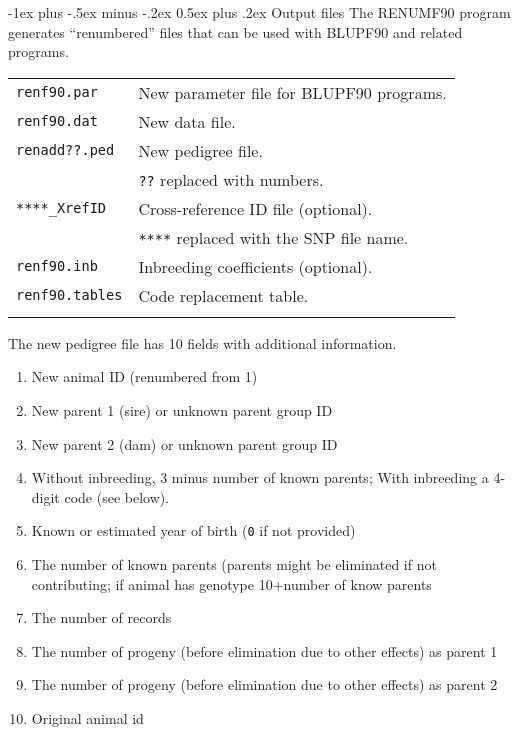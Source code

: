 \documentclass[10pt,landscape]{article}
\makeatletter
\renewcommand{\section}{\@startsection{section}{1}{0mm}%
                                {-1ex plus -.5ex minus -.2ex}%
                                {0.5ex plus .2ex}%
                                {\normalfont\large\bfseries}}
\makeatother
\begin{document}
\begin{multicols}{3}
\section{Output files}
The RENUMF90 program generates ``renumbered'' files that can be used with BLUPF90 and related programs.

\begin{tabular}{@{}ll@{}}
  \verb|renf90.par| & New parameter file for BLUPF90 programs.\\
  \verb|renf90.dat| & New data file.\\
  \verb|renadd??.ped| & New pedigree file. \\
                     & \verb|??| replaced with numbers.\\
  \verb|****_XrefID| & Cross-reference ID file (optional).\\
                   & \verb|****| replaced with the SNP file name.\\
  \verb|renf90.inb| & Inbreeding coefficients (optional).\\
  \verb|renf90.tables| & Code replacement table.\\
  \\
\end{tabular}

The new pedigree file has 10 fields with additional information.
\begin{enumerate}[leftmargin=*,itemsep=0pt,parsep=0pt]
\item New animal ID (renumbered from 1)
\item New parent 1 (sire) or unknown parent group ID
\item New parent 2 (dam) or unknown parent group ID
\item Without inbreeding, 3 minus number of known parents; With inbreeding a 4-digit code (see below).
\item Known or estimated year of birth (\verb|0| if not provided)
\item The number of known parents (parents might be eliminated if not contributing; if animal has genotype 10+number of know parents
\item The number of records
\item The number of progeny (before elimination due to other effects) as parent 1
\item The number of progeny (before elimination due to other effects) as parent 2
\item Original animal id
\end{enumerate}


\end{multicols}
\end{document}
